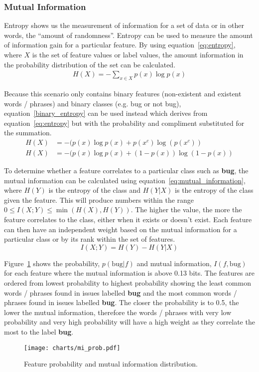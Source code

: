 \subsubsection{Mutual Information}
Entropy shows us the measurement of information for a set of data or in other words, the ``amount of randomness''. Entropy can
be used to measure the amount of information gain for a particular feature. By using equation~\ref{eq:entropy}, where $X$ is
the set of feature values or label values, the amount information in the probability distribution of the set can be calculated.
\begin{align}
	\label{eq:entropy}
	H(X) = -\sum_{x \in X} p(x) \log p(x)
\end{align}

Because this scenario only contains binary features (non-existent and existent words / phrases) and binary classes
(e.g. bug or not bug), equation~\ref{binary_entropy} can be used instead which derives from equation~\ref{eq:entropy} but with
the probability and compliment substituted for the summation.
\begin{equation}
	\label{eq:binary_entropy}
	\begin{split}
		H(X) &= -(p(x) \log p(x) + p(x^c)     \log(p(x^c))   \\
		H(X) &= -(p(x) \log p(x) + (1 - p(x)) \log(1 - p(x))
	\end{split}
\end{equation}

To determine whether a feature correlates to a particular class such as \textbf{bug}, the mutual information can be calculated
using equation~\ref{eq:mutual_information}, where $H(Y)$ is the entropy of the class and $H(Y|X)$ is the entropy of the class
given the feature. This will produce numbers within the range $0 \leq I(X;Y) \leq \min(H(X), H(Y))$. The higher the value, the
more the feature correlates to the class, either when it exists or doesn't exist. Each feature can then have an independent
weight based on the mutual information for a particular class or by its rank within the set of features.
\begin{equation}
	\label{eq:mutual_information}
	I(X;Y) = H(Y) - H(Y|X)
\end{equation}

Figure~\ref{fig:mi_prob} shows the probability, $p(\mathrm{bug}|f)$ and mutual information, $I(f,\mathrm{bug})$ for each feature
where the mutual information is above 0.13 bits. The features are ordered from lowest probability to highest probability showing
the least common words / phrases found in issues labelled \textbf{bug} and the most common words / phrases found in issues
labelled \textbf{bug}. The closer the probability is to 0.5, the lower the mutual information, therefore the words / phrases
with very low probability and very high probability will have a high weight as they correlate the most to the label
\textbf{bug}.
\begin{figure}[h]
	\centering
	\texttt{[image: charts/mi\_prob.pdf]}
	\label{fig:mi_prob}
	\caption{Feature probability and mutual information distribution.}
\end{figure}

